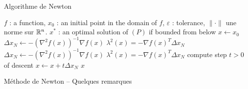 \documentclass[aspectratio = 169]{beamer}
\begin{document}
\begin{frame}{Algorithme de Newton}
    \begin{algorithm}[H]
    \caption{Méthode de Newton}
    \small{
      \begin{algorithmic}[1]
        \Statex
        \Require $f$ : a function,  $x_0$ : an initial point in the domain of $f$, $\varepsilon$ : tolerance, $\| \cdot \|$ une norme sur $\mathbb{R}^n$.
        \Ensure $x^*$ : an optimal solution of $(P)$ if bounded from below
        \Statex
        \State $x \leftarrow x_0$
        \State $\Delta x_N \leftarrow -\left(\nabla^2 f(x)\right)^{-1}\nabla f(x)$
        \State $\lambda^2(x) = -\nabla f(x)^T\Delta x_N$
        \State $\Delta x_N \leftarrow -\left(\nabla^2 f(x)\right)^{-1}\nabla f(x)$
        \State $\lambda^2(x) = -\nabla f(x)^T\Delta x_N$
        \State compute step $t > 0$ of descent
        \State $x \leftarrow x + t\Delta x_N$
        \EndWhile
        \State \Return $x$
        \EndFunction
        \Statex
      \end{algorithmic}
    }
  \end{algorithm}
\end{frame}

\begin{frame}{Méthode de Newton -- Quelques remarques}

\end{frame}
\end{document}
